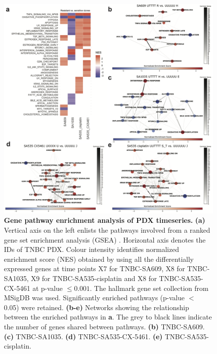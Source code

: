 \begin{figure}
\centering
  \includegraphics[width=\textwidth]{Figures/chap5/pathwaysnetwork.png}
\caption[Gene pathway enrichment analysis of PDX timeseries]
	{\small
	\textbf{Gene pathway enrichment analysis of PDX timeseries.}
	 	\textbf{(a)} Vertical axis on the left enlists the pathways involved from a ranked gene set enrichment analysis (GSEA) \cite{shi2007gene}. Horizontal axis denotes the IDs of TNBC PDX. Colour intensity identifies normalized enrichment score (NES) obtained by using all the differentially expressed genes at time points X7 for TNBC-SA609, X8 for TNBC-SA1035, X9 for TNBC-SA535-cisplatin and X8 for TNBC-SA535-CX-5461 at p-value $\leq 0.001$. The hallmark gene set collection from MSigDB \cite{liberzon2015molecular} was used. Significantly enriched pathways (p-value $<$ 0.05) were retained.   \textbf{(b-e)} Networks showing the relationship between the enriched pathways in \textbf{a}. The grey to black lines indicate the number of genes shared between pathways. \textbf{(b)} TNBC-SA609. \textbf{(c)} TNBC-SA1035.  \textbf{(d)} TNBC-SA535-CX-5461. \textbf{(e)} TNBC-SA535-cisplatin.
	}
	\label{fig:pathwaysnetwork}
\end{figure}




